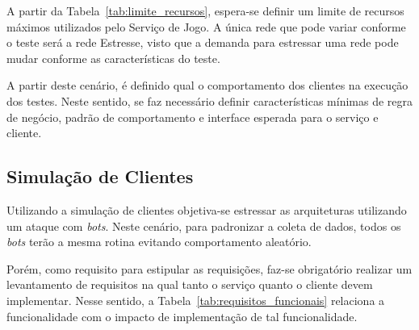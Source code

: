 A partir da Tabela~\ref{tab:limite_recursos}, espera-se definir um limite de recursos máximos utilizados pelo Serviço de Jogo.
%
A única rede que pode variar conforme o teste será a rede Estresse, visto que a demanda para estressar uma rede pode mudar conforme as características do teste.

A partir deste cenário, é definido qual o comportamento dos clientes na execução dos testes.
%
Neste sentido, se faz necessário definir características mínimas de regra de negócio, padrão de comportamento e interface esperada para o serviço e cliente.



\subsection{Simulação de Clientes}
\label{sec:SimulaCliente}



Utilizando a simulação de clientes objetiva-se estressar as arquiteturas utilizando um ataque com \textit{bots}.
%
Neste cenário, para padronizar a coleta de dados, todos os \textit{bots} terão a mesma rotina evitando comportamento aleatório.



Porém, como requisito para estipular as requisições, faz-se obrigatório realizar um levantamento de requisitos na qual tanto o serviço quanto o cliente devem implementar.
%
Nesse sentido, a Tabela~\ref{tab:requisitos_funcionais} relaciona a funcionalidade com o impacto de implementação de tal funcionalidade.



